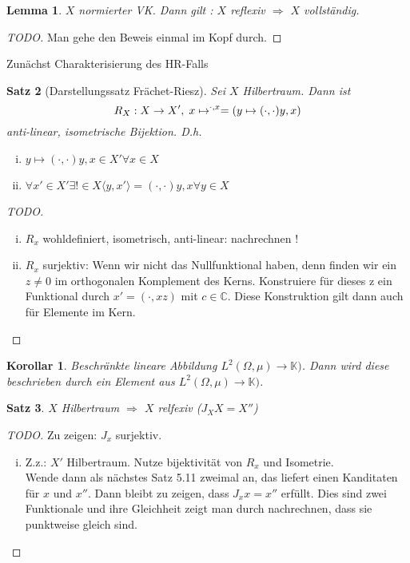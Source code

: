 \documentclass[ngerman]{report}
\theoremstyle{plain}%
\newtheorem{thm}{Satz}[chapter]
\newtheorem{lemma}[thm]{Lemma}
\newtheorem*{cor*}{Korollar}
\theoremstyle{definition}%
\theoremstyle{myStyle}
\newcommand{\C}{\mathbb{C}}
\newcommand{\K}{\mathbb{K}}
\newcommand{\df}[1][]{%
	\overset{#1}{\Rightarrow}
}
\newcommand{\SP}{(\cdot,\cdot)}
\newcommand{\fop}[1]{\langle #1 \rangle}
\begin{document}
	\begin{lemma}
		$X$ normierter VK. Dann gilt : $X$ reflexiv $\df$ $X$ vollständig.
	\end{lemma}

	\begin{proof}[TODO]
		Man gehe den Beweis einmal im Kopf durch.	
	\end{proof}

	Zunächst Charakterisierung des HR-Falls
	
	\begin{thm}[Darstellungssatz Frächet-Riesz]
		Sei $X$ Hilbertraum. Dann ist 
			$$R_X : X \to X', \; x \mapsto \sp{\cdot, x} = (y \mapsto \SP{y,x})$$
			anti-linear, isometrische Bijektion. D.h.
						\begin{enumerate}[(i)]
							\item $y \mapsto \SP{y,x} \in X' \forall x\in X$
							\item $\forall x' \in X' \exists ! \in X \fop{y,x'} = \SP{y,x} \forall y \in X$
						\end{enumerate}
	\end{thm}

	\begin{proof}[TODO]
			\begin{enumerate}[(i)]
				\item $R_x$ wohldefiniert, isometrisch, anti-linear: nachrechnen !
				\item $R_x$ surjektiv: Wenn wir nicht das Nullfunktional haben, denn finden wir ein $z \neq 0$ im orthogonalen Komplement des Kerns. Konstruiere für dieses z ein Funktional durch $x' = (\cdot, x z)$ mit $c \in \C$. Diese Konstruktion gilt dann auch für Elemente im Kern.
			\end{enumerate}

	\end{proof}

	\begin{cor*}
		Beschränkte lineare Abbildung $L^2(\Omega, \mu) \to \K)$. Dann wird diese beschrieben durch ein Element aus $L^2(\Omega, \mu) \to \K)$.
	\end{cor*}

	\begin{thm}
		$X$ Hilbertraum $\df$ $X$ relfexiv ($J_X X = X''$)
	\end{thm}

	\begin{proof}[TODO]
		Zu zeigen: $J_x$ surjektiv.
		\begin{enumerate}[(i)]
			\item Z.z.: $X'$ Hilbertraum. Nutze bijektivität von $R_x$ und Isometrie.\\ 
			Wende dann als nächstes Satz 5.11 zweimal an, das liefert einen Kanditaten für $x$ und $x''$.
			Dann bleibt zu zeigen, dass $J_x x = x''$ erfüllt.
			Dies sind zwei Funktionale und ihre Gleichheit zeigt man durch nachrechnen, dass sie punktweise gleich sind.
		\end{enumerate}

	\end{proof}
\end{document}
